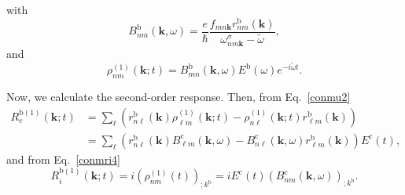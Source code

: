 with
\begin{equation}\label{rho1} 
B^{\mathrm{b}}_{nm}(\mathbf{k},\omega)=
\frac{e}{\hbar}\frac{f_{mn\mathbf{k}}r^{\mathrm{b}}_{nm}(\mathbf{k})}{\omega^\sigma_{nm\mathbf{k}}-\tilde{\omega}}
,
\end{equation} 
and
\begin{equation}\label{rhonoi1}
\rho^{(1)}_{nm}(\mathbf{k};t)=B^{\mathrm{b}}_{mn}(\mathbf{k},\omega)E^{\mathrm{b}}(\omega)e^{-i\tilde{\omega} t}
.
\end{equation}

Now, we calculate the second-order response. Then, from Eq.~\eqref{conmu2}
\begin{align}\label{R1e}
R_e^{\mathrm{b}(1)}(\mathbf{k};t)
&=
\sum_{\ell}
\left(
r^{\mathrm{b}}_{n\ell}(\mathbf{k})
\rho^{(1)}_{\ell m}(\mathbf{k};t)
-
\rho^{(1)}_{n\ell}(\mathbf{k};t)
r^{\mathrm{b}}_{\ell m}(\mathbf{k})
\right)
\nonumber \\
&=
\sum_{\ell}
\left(
r^{\mathrm{b}}_{n\ell}(\mathbf{k})
B^{\mathrm{c}}_{\ell m}(\mathbf{k},\omega)
-
B^{\mathrm{c}}_{n\ell}(\mathbf{k},\omega)
r^{\mathrm{b}}_{\ell m}(\mathbf{k})
\right)E^{\mathrm{c}}(t)
,
\end{align}
and from Eq.~\eqref{conmri4}
\begin{equation}\label{R1i}
R_i^{\mathrm{b}(1)}(\mathbf{k};t)=
i(\rho^{(1)}_{nm}(t))_{;k^{\mathrm{b}}}=
iE^{\mathrm{c}}(t)(B^{\mathrm{c}}_{nm}(\mathbf{k},\omega))_{;k^{\mathrm{b}}}
.
\end{equation}

